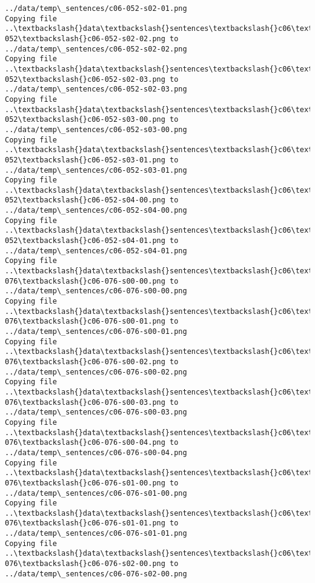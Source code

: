 \documentclass[11pt]{article}
\begin{document}
\begin{Verbatim}[commandchars=\\\{\}]
../data/temp\_sentences/c06-052-s02-01.png
Copying file ..\textbackslash{}data\textbackslash{}sentences\textbackslash{}c06\textbackslash{}c06-052\textbackslash{}c06-052-s02-02.png to
../data/temp\_sentences/c06-052-s02-02.png
Copying file ..\textbackslash{}data\textbackslash{}sentences\textbackslash{}c06\textbackslash{}c06-052\textbackslash{}c06-052-s02-03.png to
../data/temp\_sentences/c06-052-s02-03.png
Copying file ..\textbackslash{}data\textbackslash{}sentences\textbackslash{}c06\textbackslash{}c06-052\textbackslash{}c06-052-s03-00.png to
../data/temp\_sentences/c06-052-s03-00.png
Copying file ..\textbackslash{}data\textbackslash{}sentences\textbackslash{}c06\textbackslash{}c06-052\textbackslash{}c06-052-s03-01.png to
../data/temp\_sentences/c06-052-s03-01.png
Copying file ..\textbackslash{}data\textbackslash{}sentences\textbackslash{}c06\textbackslash{}c06-052\textbackslash{}c06-052-s04-00.png to
../data/temp\_sentences/c06-052-s04-00.png
Copying file ..\textbackslash{}data\textbackslash{}sentences\textbackslash{}c06\textbackslash{}c06-052\textbackslash{}c06-052-s04-01.png to
../data/temp\_sentences/c06-052-s04-01.png
Copying file ..\textbackslash{}data\textbackslash{}sentences\textbackslash{}c06\textbackslash{}c06-076\textbackslash{}c06-076-s00-00.png to
../data/temp\_sentences/c06-076-s00-00.png
Copying file ..\textbackslash{}data\textbackslash{}sentences\textbackslash{}c06\textbackslash{}c06-076\textbackslash{}c06-076-s00-01.png to
../data/temp\_sentences/c06-076-s00-01.png
Copying file ..\textbackslash{}data\textbackslash{}sentences\textbackslash{}c06\textbackslash{}c06-076\textbackslash{}c06-076-s00-02.png to
../data/temp\_sentences/c06-076-s00-02.png
Copying file ..\textbackslash{}data\textbackslash{}sentences\textbackslash{}c06\textbackslash{}c06-076\textbackslash{}c06-076-s00-03.png to
../data/temp\_sentences/c06-076-s00-03.png
Copying file ..\textbackslash{}data\textbackslash{}sentences\textbackslash{}c06\textbackslash{}c06-076\textbackslash{}c06-076-s00-04.png to
../data/temp\_sentences/c06-076-s00-04.png
Copying file ..\textbackslash{}data\textbackslash{}sentences\textbackslash{}c06\textbackslash{}c06-076\textbackslash{}c06-076-s01-00.png to
../data/temp\_sentences/c06-076-s01-00.png
Copying file ..\textbackslash{}data\textbackslash{}sentences\textbackslash{}c06\textbackslash{}c06-076\textbackslash{}c06-076-s01-01.png to
../data/temp\_sentences/c06-076-s01-01.png
Copying file ..\textbackslash{}data\textbackslash{}sentences\textbackslash{}c06\textbackslash{}c06-076\textbackslash{}c06-076-s02-00.png to
../data/temp\_sentences/c06-076-s02-00.png

\end{Verbatim}
\end{document}

